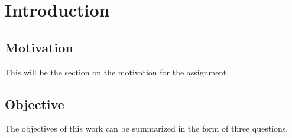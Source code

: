 \chapter{Introduction} \label{chap:intro}
\begin{comment}
    * What are machine learning models, and where are they applied?
    * What is echocardiography, and why is it useful?
    * Mention that it is commonplace among clinicians to extract strain curves from ultrasound videos.
    * Transition into the fact that one often uses peak strain values, and EF to diagnose heart failure, and other heart diseases.
    * Mention that the input data used in this thesis are \textbf{longitudinal strain curves, peak strain values, and EF}.
    * Mention that the target variables of this thesis are the binary variables: \textbf{Heart failure, patient diagnosis, and segment indication}.
\end{comment}

\section{Motivation}
\begin{comment}
    * Mention examples of where machine learning models have performed well
        * Computor vision.
        * Autonomous vehicles.
        * NLP
        * Speech recognition: Siri (Apple), Alexa (Amazon)
    * End with speech recognition because they are made up of time-series data.
    * Transition over to the statement that given that machine learning has performed so well in these other fields it warrants investigation to see if machine learning could assist with the diagnosis of patients potentially assisting clinicians.
    * Hence the objective of this thesis is to explore whether combination of supervised/unsupervised models and continous/peak-values could perform well at predicting the three different target variables
    * Illustrate this with the table you have been dreaming about.
\end{comment}

This will be the section on the motivation for the assignment.

\section{Objective} \label{sec:objective}

The objectives of this work can be summarized in the form of three questions.

